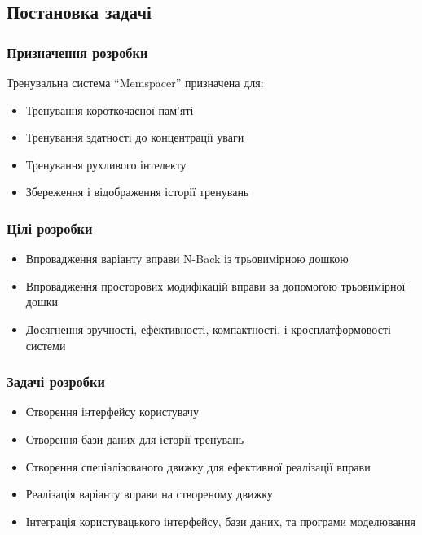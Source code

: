 \newpage
\subsection{Постановка задачі}

\subsubsection{Призначення розробки}

Тренувальна система “Memspacer” призначена для:

\begin{itemize}
  \item Тренування короткочасної пам'яті
  \item Тренування здатності до концентрації уваги
  \item Тренування рухливого інтелекту
  \item Збереження і відображення історії тренувань
\end{itemize}

\subsubsection{Цілі розробки}

\begin{itemize}
  \item Впровадження варіанту вправи N-Back із трьовимірною дошкою
  \item Впровадження просторових модифікацій вправи за допомогою трьовимірної дошки
  \item Досягнення зручності, ефективності, компактності, і кросплатформовості системи
\end{itemize}

\subsubsection{Задачі розробки}

\begin{itemize}
  \item Створення інтерфейсу користувачу
  \item Створення бази даних для історії тренувань
  \item Створення спеціалізованого движку для ефективної реалізації вправи
  \item Реалізація варіанту вправи на створеному движку
  \item Інтеграція користувацького інтерфейсу, бази даних, та програми моделювання
\end{itemize}